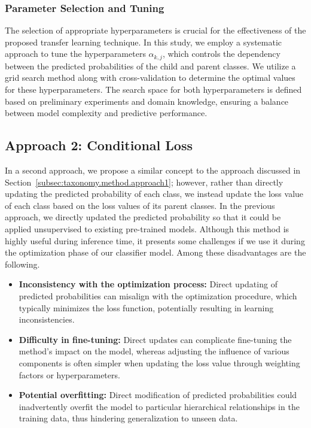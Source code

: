 \subsubsection{Parameter Selection and Tuning}
The selection of appropriate hyperparameters is crucial for the effectiveness of the proposed transfer learning technique. In this study, we employ a systematic approach to tune the hyperparameters $\alpha_{k,j} $, which controls the dependency between the predicted probabilities of the child and parent classes. We utilize a grid search method along with cross-validation to determine the optimal values for these hyperparameters. The search space for both hyperparameters is defined based on preliminary experiments and domain knowledge, ensuring a balance between model complexity and predictive performance.
\subsection{Approach 2: Conditional Loss}\label{subsec:taxonomy.method.approach2}
In a second approach, we propose a similar concept to the approach discussed in Section~\ref{subsec:taxonomy.method.approach1}; however, rather than directly updating the predicted probability of each class, we instead update the loss value of each class based on the loss values of its parent classes. In the previous approach, we directly updated the predicted probability so that it could be applied unsupervised to existing pre-trained models. Although this method is highly useful during inference time, it presents some challenges if we use it during the optimization phase of our classifier model. Among these disadvantages are the following.
\begin{itemize}
    \item \textbf{Inconsistency with the optimization process:} Direct updating of predicted probabilities can misalign with the optimization procedure, which typically minimizes the loss function, potentially resulting in learning inconsistencies.
    \item \textbf{Difficulty in fine-tuning:} Direct updates can complicate fine-tuning the method's impact on the model, whereas adjusting the influence of various components is often simpler when updating the loss value through weighting factors or hyperparameters.
    \item \textbf{Potential overfitting:} Direct modification of predicted probabilities could inadvertently overfit the model to particular hierarchical relationships in the training data, thus hindering generalization to unseen data.
\end{itemize}
